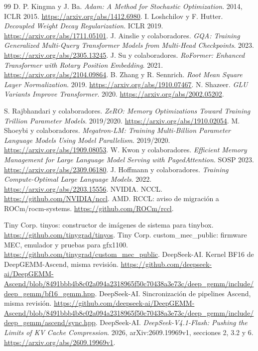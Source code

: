 \documentclass[12pt,a4paper,oneside]{report}
\begin{document}
\begin{thebibliography}{99}
 D. P. Kingma y J. Ba. \emph{Adam: A Method for Stochastic Optimization}. 2014, ICLR 2015. \url{https://arxiv.org/abs/1412.6980}.
 I. Loshchilov y F. Hutter. \emph{Decoupled Weight Decay Regularization}. ICLR 2019. \url{https://arxiv.org/abs/1711.05101}.
 J. Ainslie y colaboradores. \emph{GQA: Training Generalized Multi-Query Transformer Models from Multi-Head Checkpoints}. 2023. \url{https://arxiv.org/abs/2305.13245}.
 J. Su y colaboradores. \emph{RoFormer: Enhanced Transformer with Rotary Position Embedding}. 2021. \url{https://arxiv.org/abs/2104.09864}.
 B. Zhang y R. Sennrich. \emph{Root Mean Square Layer Normalization}. 2019. \url{https://arxiv.org/abs/1910.07467}.
 N. Shazeer. \emph{GLU Variants Improve Transformer}. 2020. \url{https://arxiv.org/abs/2002.05202}.


 S. Rajbhandari y colaboradores. \emph{ZeRO: Memory Optimizations Toward Training Trillion Parameter Models}. 2019/2020. \url{https://arxiv.org/abs/1910.02054}.
 M. Shoeybi y colaboradores. \emph{Megatron-LM: Training Multi-Billion Parameter Language Models Using Model Parallelism}. 2019/2020. \url{https://arxiv.org/abs/1909.08053}.
 W. Kwon y colaboradores. \emph{Efficient Memory Management for Large Language Model Serving with PagedAttention}. SOSP 2023. \url{https://arxiv.org/abs/2309.06180}.
 J. Hoffmann y colaboradores. \emph{Training Compute-Optimal Large Language Models}. 2022. \url{https://arxiv.org/abs/2203.15556}.
 NVIDIA. NCCL. \url{https://github.com/NVIDIA/nccl}.
 AMD. RCCL: aviso de migración a ROCm/rocm-systems. \url{https://github.com/ROCm/rccl}.

 Tiny Corp. tinyos: constructor de imágenes de sistema para tinybox. \url{https://github.com/tinygrad/tinyos}.
 Tiny Corp. custom\_mec\_public: firmware MEC, emulador y pruebas para gfx1100. \url{https://github.com/tinygrad/custom_mec_public}.
 DeepSeek-AI. Kernel BF16 de DeepGEMM-Ascend, misma revisión. \url{https://github.com/deepseek-ai/DeepGEMM-Ascend/blob/8491bbb4b8c02a094a2318965f50c70438a3e73c/deep_gemm/include/deep_gemm/bf16_gemm.hpp}.
 DeepSeek-AI. Sincronización de pipelines Ascend, misma revisión. \url{https://github.com/deepseek-ai/DeepGEMM-Ascend/blob/8491bbb4b8c02a094a2318965f50c70438a3e73c/deep_gemm/include/deep_gemm/ascend/sync.hpp}.
 DeepSeek-AI. \emph{DeepSeek-V4.1-Flash: Pushing the Limits of KV Cache Compression}. 2026, arXiv:2609.19969v1, secciones 2, 3.2 y 6. \url{https://arxiv.org/abs/2609.19969v1}.
\end{thebibliography}

\clearpage
\renewcommand{\contentsname}{Índice detallado}
\tableofcontents
\end{document}
